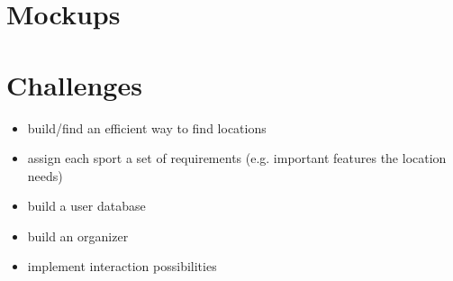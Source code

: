 \documentclass[aspectratio=169]{beamer}
\begin{document}
\section{Mockups}


\section{Challenges}
\begin{frame}
	\begin{itemize}
		\item build/find an efficient way to find locations
		\item assign each sport a set of requirements (e.g. important features the location needs)
		\item build a user database
		\item build an organizer 
		\item implement interaction possibilities
	\end{itemize}
\end{frame}
\end{document}
